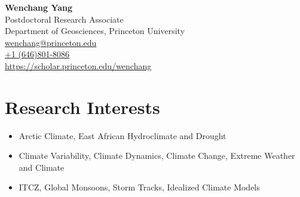 \documentclass[11pt]{article}
\newcommand{\cu}{\href{http://www.columbia.edu}{Columbia University}}
\newcommand{\contact}[1]{ {\centering #1} }
\begin{document}
{{		\vspace{-1.25in} \hspace{1.6in}
		\begin{minipage}{6in}
            		\contact{\flushleft 
				{\Large\bf Wenchang Yang} \\
				Postdoctoral Research Associate \\ 
            			Department of Geosciences, Princeton University \\ 
            			\url{wenchang@princeton.edu} \\
            			\url{+1 (646)801-8086} \\
            			\url{https://scholar.princeton.edu/wenchang}\\
            		}
		\end{minipage}
	}{}
}

\vspace{1ex}
\section{Research Interests}
\begin{itemize}[leftmargin=4ex]
	\item Arctic Climate, East African Hydroclimate and Drought
	\item Climate Variability, Climate Dynamics, Climate Change, Extreme Weather and Climate
	\item ITCZ, Global Monsoons, Storm Tracks, Idealized Climate Models
\end{itemize}
\end{document}
